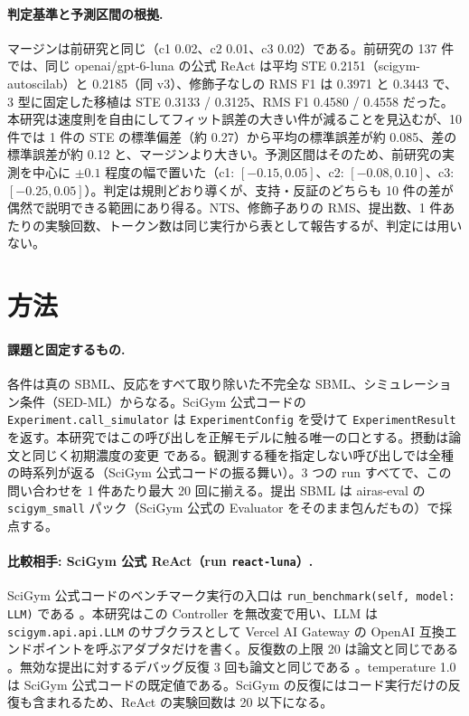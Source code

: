 \documentclass{article}
\providecommand{\unverified}[1]{#1}
\begin{document}


\paragraph{判定基準と予測区間の根拠.}
マージンは前研究と同じ（c1 0.02、c2 0.01、c3 0.02）である。前研究の 137 件では、同じ openai/gpt-6-luna の公式 ReAct は平均 STE \unverified{0.2151}（scigym-autoscilab）と \unverified{0.2185}（同 v3）、修飾子なしの RMS F1 は \unverified{0.3971} と \unverified{0.3443} で、3 型に固定した移植は STE \unverified{0.3133} / \unverified{0.3125}、RMS F1 \unverified{0.4580} / \unverified{0.4558} だった。本研究は速度則を自由にしてフィット誤差の大きい件が減ることを見込むが、10 件では 1 件の STE の標準偏差（約 0.27）から平均の標準誤差が約 0.085、差の標準誤差が約 0.12 と、マージンより大きい。予測区間はそのため、前研究の実測を中心に $\pm 0.1$ 程度の幅で置いた（c1: $[-0.15, 0.05]$、c2: $[-0.08, 0.10]$、c3: $[-0.25, 0.05]$）。判定は規則どおり導くが、支持・反証のどちらも 10 件の差が偶然で説明できる範囲にあり得る。NTS、修飾子ありの RMS、提出数、1 件あたりの実験回数、トークン数は同じ実行から表として報告するが、判定には用いない。

\section{方法}
\label{sec:method}
\paragraph{課題と固定するもの.}
各件は真の SBML、反応をすべて取り除いた不完全な SBML、シミュレーション条件（SED-ML）からなる。SciGym 公式コードの \texttt{Experiment.call\_simulator} \cite[s1.p12]{duan-2025-measuring} は \texttt{ExperimentConfig} を受けて \texttt{ExperimentResult} を返す。本研究ではこの呼び出しを正解モデルに触る唯一の口とする。摂動は論文と同じく初期濃度の変更 \cite[s1.p4]{duan-2025-measuring} である。観測する種を指定しない呼び出しでは全種の時系列が返る（SciGym 公式コードの振る舞い）。3 つの run すべてで、この問い合わせを 1 件あたり最大 20 回に揃える。提出 SBML は airas-eval の \texttt{scigym\_small} パック（SciGym 公式の Evaluator をそのまま包んだもの）で採点する。

\paragraph{比較相手: SciGym 公式 ReAct（run \texttt{react-luna}）.}
SciGym 公式コードのベンチマーク実行の入口は \texttt{run\_benchmark(self, model: LLM)} である \cite[s1.p11]{duan-2025-measuring}。本研究はこの Controller を無改変で用い、LLM は \texttt{scigym.api.api.LLM} のサブクラスとして Vercel AI Gateway の OpenAI 互換エンドポイントを呼ぶアダプタだけを書く。反復数の上限 20 は論文と同じである \cite[s1.p1]{duan-2025-measuring}。無効な提出に対するデバッグ反復 3 回も論文と同じである \cite[s1.p2]{duan-2025-measuring}。temperature 1.0 は SciGym 公式コードの既定値である。SciGym の反復にはコード実行だけの反復も含まれるため、ReAct の実験回数は 20 以下になる。
\end{document}
